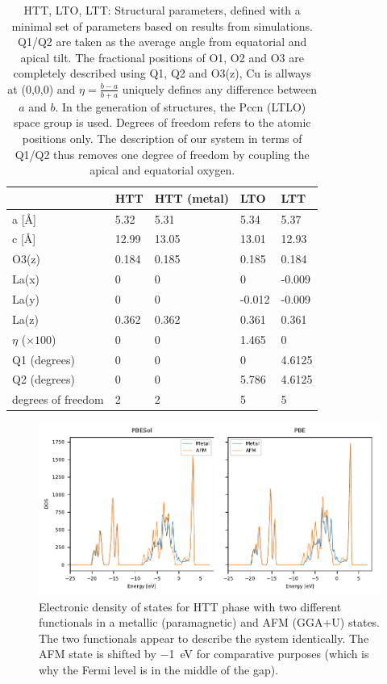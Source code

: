 \begin{table}[b]
    \centering
    \begin{tabular}{@{}lllll@{}}
    \toprule
               & HTT & HTT (metal)  & LTO    & LTT    \\ \midrule
    a [\AA]         & 5.32 & 5.31 & 5.34   & 5.37   \\
    c [\AA]         & 12.99 & 13.05 & 13.01  & 12.93  \\
    O3(z)      & 0.184 & 0.185 & 0.185  & 0.184  \\
    La(x)      & 0     & 0 & 0      & -0.009 \\
    La(y)      & 0     & 0 & -0.012 & -0.009 \\
    La(z)      & 0.362 & 0.362 & 0.361  & 0.361  \\
    $\eta$ ($\times 100$) & 0  & 0 &  1.465  & 0      \\
    Q1 (degrees)        & 0 & 0 &  0      & 4.6125 \\
    Q2 (degrees)        & 0 & 0 &  5.786  & 4.6125 \\ 
    degrees of freedom & 2 & 2 & 5 & 5 \\ \bottomrule
    \end{tabular}
    \caption[HTT, LTO, LTT: Structural parameters]{HTT, LTO, LTT: Structural parameters, defined with a minimal set of parameters based on results from simulations. Q1/Q2 are taken as the average angle from equatorial and apical tilt. The fractional positions of O1, O2 and O3 are completely described using Q1, Q2 and O3(z), Cu is allways at (0,0,0) and $\eta = \frac{b-a}{b+a}$ uniquely defines any difference between $a$ and $b$. In the generation of structures, the Pccn (LTLO) space group is used. Degrees of freedom refers to the atomic positions only. The description of our system in terms of Q1/Q2 thus removes one degree of freedom by coupling the apical and equatorial oxygen.}
    \label{tab:struct_par}
\end{table}



\begin{figure}
    \centering
    \includegraphics{fig/simulation/htt_dos.pdf}
    \caption[Electronic DOS: Metal and AFM]{Electronic density of states for HTT phase with two different functionals in a metallic (paramagnetic) and AFM (GGA+U) states. The two functionals appear to describe the system identically. The AFM state is shifted by \SI{-1}{\eV} for comparative purposes (which is why the Fermi level is in the middle of the gap).}
    \label{fig:edos_htt}
\end{figure}

